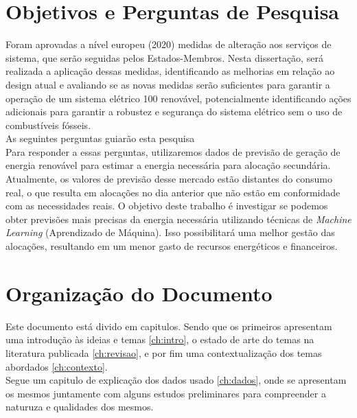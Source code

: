 \section{Objetivos e Perguntas de Pesquisa\label{se:objetivos}}

Foram aprovadas a nível europeu (2020) medidas de alteração aos serviços de sistema, que serão seguidas pelos Estados-Membros. Nesta dissertação, será realizada a aplicação dessas medidas, identificando as melhorias em relação ao design atual e avaliando se as novas medidas serão suficientes para garantir a operação de um sistema elétrico 100 renovável, potencialmente identificando ações adicionais para garantir a robustez e segurança do sistema elétrico sem o uso de combustíveis fósseis. \\

As seguintes perguntas guiarão esta pesquisa\\


Para responder a essas perguntas, utilizaremos dados de previsão de geração de energia renovável para estimar a energia necessária para alocação secundária. Atualmente, os valores de previsão desse mercado estão distantes do consumo real, o que resulta em alocações no dia anterior que não estão em conformidade com as necessidades reais. O objetivo deste trabalho é investigar se podemos obter previsões mais precisas da energia necessária utilizando técnicas de \textit{Machine Learning} (Aprendizado de Máquina). Isso possibilitará uma melhor gestão das alocações, resultando em um menor gasto de recursos energéticos e financeiros.

\section{Organização do Documento \label{se:organização}}

Este documento está divido em capitulos. Sendo que os primeiros apresentam uma introdução às ideias e temas \ref{ch:intro}, o estado de arte do temas na literatura publicada \ref{ch:revisao}, e por fim uma contextualização dos temas abordados \ref{ch:contexto}. \\
Segue um capitulo de explicação dos dados usado \ref{ch:dados}, onde se apresentam os mesmos juntamente com alguns estudos preliminares para compreender a naturuza e qualidades dos mesmos. \\%

